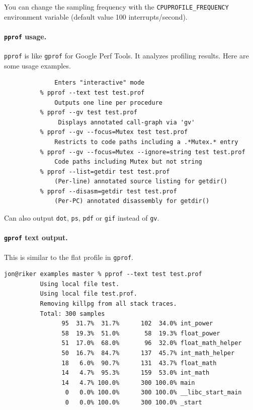 \documentclass[11pt]{article}
\begin{document}
You can change the sampling frequency with the {\tt CPUPROFILE\_FREQUENCY} environment variable
(default value 100 interrupts/second).

\paragraph{{\tt pprof} usage.} {\tt pprof} is like {\tt gprof} for Google Perf Tools. It
analyzes profiling results. Here are some usage examples.
  \begin{lstlisting}[basicstyle=\tiny]
          % pprof test test.prof
              Enters "interactive" mode
          % pprof --text test test.prof
              Outputs one line per procedure
          % pprof --gv test test.prof
               Displays annotated call-graph via 'gv'
          % pprof --gv --focus=Mutex test test.prof
              Restricts to code paths including a .*Mutex.* entry
          % pprof --gv --focus=Mutex --ignore=string test test.prof
              Code paths including Mutex but not string
          % pprof --list=getdir test test.prof
              (Per-line) annotated source listing for getdir()
          % pprof --disasm=getdir test test.prof
              (Per-PC) annotated disassembly for getdir()
  \end{lstlisting}

Can also output {\tt dot}, {\tt ps}, {\tt pdf} or {\tt gif} instead of {\tt gv}.

\paragraph{{\tt gprof} text output.}
This is similar to the flat profile in {\tt gprof}.

  \begin{lstlisting}[basicstyle=\tiny]
          jon@riker examples master % pprof --text test test.prof 
          Using local file test.
          Using local file test.prof.
          Removing killpg from all stack traces.
          Total: 300 samples
                95  31.7%  31.7%      102  34.0% int_power
                58  19.3%  51.0%       58  19.3% float_power
                51  17.0%  68.0%       96  32.0% float_math_helper
                50  16.7%  84.7%      137  45.7% int_math_helper
                18   6.0%  90.7%      131  43.7% float_math
                14   4.7%  95.3%      159  53.0% int_math
                14   4.7% 100.0%      300 100.0% main
                 0   0.0% 100.0%      300 100.0% __libc_start_main
                 0   0.0% 100.0%      300 100.0% _start
  \end{lstlisting}
\end{document}
